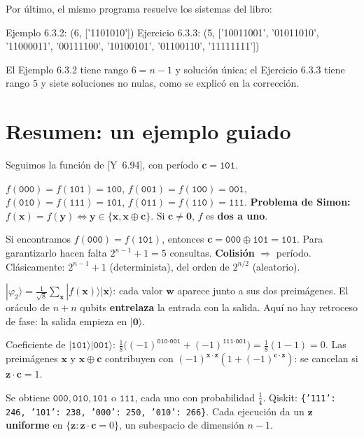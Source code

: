\documentclass[11pt, a4paper, twoside, openright]{report}
\newcommand{\pasoguiado}[3]{%
\begin{tcolorbox}[colback=gray!6!white,colframe=gray!55!black,title={#1}]
#2
\tcblower
\small #3
\end{tcolorbox}}
\providecommand{\ket}[1]{|#1\rangle}
\newcommand{\bx}{\mathbf{x}}
\newcommand{\by}{\mathbf{y}}
\newcommand{\bz}{\mathbf{z}}
\newcommand{\bc}{\mathbf{c}}
\newcommand{\bw}{\mathbf{w}}
\newcommand{\bcero}{\mathbf{0}}
\newcommand{\Yan}[1]{\textcolor{rosaviejo}{\small[Y~#1]}}  %
\begin{document}
\noindent Por último, el mismo programa resuelve los sistemas del libro:
\begin{codigo}[language={}]
Ejemplo 6.3.2:   (6, ['1101010'])
Ejercicio 6.3.3: (5, ['10011001', '01011010', '11000011', '00111100',
                      '10100101', '01100110', '11111111'])
\end{codigo}
\noindent El Ejemplo 6.3.2 tiene rango $6 = n-1$ y solución única; el Ejercicio 6.3.3 tiene rango $5$ y siete soluciones no nulas, como se explicó en la corrección.

\cleardoublepage
\section{Resumen: un ejemplo guiado}

\noindent Seguimos la función de \Yan{6.94}, con período $\bc = \texttt{101}$.

\pasoguiado{Paso 1. El problema}
{$f(\texttt{000}) = f(\texttt{101}) = \texttt{100}$, \; $f(\texttt{001}) = f(\texttt{100}) = \texttt{001}$, \; $f(\texttt{010}) = f(\texttt{111}) = \texttt{101}$, \; $f(\texttt{011}) = f(\texttt{110}) = \texttt{111}$.}
{\textbf{Problema de Simon:} $f(\bx) = f(\by)\iff\by\in\{\bx, \bx\oplus\bc\}$. Si $\bc\neq\bcero$, $f$ es \textbf{dos a uno}.}

\pasoguiado{Paso 2. Clásicamente}
{Si encontramos $f(\texttt{000}) = f(\texttt{101})$, entonces $\bc = \texttt{000}\oplus\texttt{101} = \texttt{101}$. Para garantizarlo hacen falta $2^{n-1}+1 = 5$ consultas.}
{\textbf{Colisión} $\Rightarrow$ período. Clásicamente: $2^{n-1}+1$ (determinista), del orden de $2^{n/2}$ (aleatorio).}

\pasoguiado{Paso 3. Superposición y consulta}
{$\ket{\varphi_2} = \frac{1}{\sqrt8}\sum_{\bx}\ket{f(\bx)}\ket{\bx}$: cada valor $\bw$ aparece junto a sus dos preimágenes.}
{El oráculo de $n+n$ qubits \textbf{entrelaza} la entrada con la salida. Aquí no hay retroceso de fase: la salida empieza en $\ket{\bcero}$.}

\pasoguiado{Paso 4. Interferencia}
{Coeficiente de $\ket{\texttt{101}}\ket{\texttt{001}}$: $\frac18\big((-1)^{\texttt{010}\cdot\texttt{001}} + (-1)^{\texttt{111}\cdot\texttt{001}}\big) = \frac18(1-1) = 0$.}
{Las preimágenes $\bx$ y $\bx\oplus\bc$ contribuyen con $(-1)^{\bx\cdot\bz}(1 + (-1)^{\bc\cdot\bz})$: se cancelan si $\bz\cdot\bc = 1$.}

\pasoguiado{Paso 5. Medir}
{Se obtiene $\texttt{000}, \texttt{010}, \texttt{101}$ o $\texttt{111}$, cada uno con probabilidad $\frac14$. Qiskit: \texttt{\{'111': 246, '101': 238, '000': 250, '010': 266\}}.}
{Cada ejecución da un $\bz$ \textbf{uniforme} en $\{\bz:\bz\cdot\bc = 0\}$, un subespacio de dimensión $n-1$.}
\end{document}
